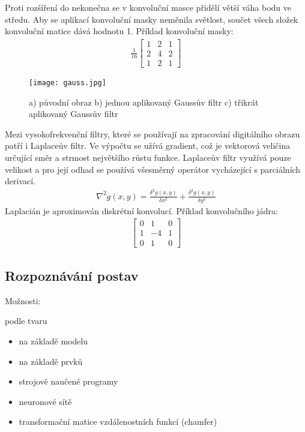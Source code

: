 Proti rozšíření do nekonečna se v konvoluční masce přidělí větší váha bodu ve středu. Aby se aplikací konvoluční masky neměnila světlost, součet všech složek konvoluční matice dává hodnotu 1. Příklad konvoluční masky:
\begin{eqnarray}
\frac{1}{16} \begin{bmatrix}
1 & 2 & 1 \\
2 & 4 & 2 \\
1 & 2 & 1
\end{bmatrix}
\end{eqnarray} 

\begin{figure}[h]
\centering
\texttt{[image: gauss.jpg]}
\caption{a) původní obraz b) jednou aplikovaný Gaussův filtr c) třikrát aplikovaný Gaussův filtr~\cite{15} }
\end{figure}

Mezi vysokofrekvenční filtry, které se používají na zpracování digitálního obrazu patří i Laplaceův filtr. Ve výpočtu se užívá gradient, což je vektorová veličina určující směr a strmost největšího růstu funkce. Laplaceův filtr využívá pouze velikost a pro její odhad se používá všesměrný operátor vycházející s parciálních derivací.
\begin{eqnarray}
\nabla^{2}g(x,y) = \frac{\delta^{2}g(x,y)}{\delta x^{2}} + \frac{\delta^{2}g(x,y)}{\delta y^{2}}
\end{eqnarray} 
Laplacián je aproximován diskrétní konvolucí. Příklad konvolučního jádra:
\begin{eqnarray}
\begin{bmatrix}
0 & 1 & 0 \\
1 & -4 & 1 \\
0 & 1 & 0
\end{bmatrix}
\end{eqnarray} 


\subsection{Rozpoznávání postav}
Možnosti:

podle tvaru
\begin{itemize}
\item na základě modelu


\item na základě prvků

\item strojově naučené programy
\item neuronové sítě %
\item transformační matice vzdálenostních funkcí (chamfer)
\end{itemize}

